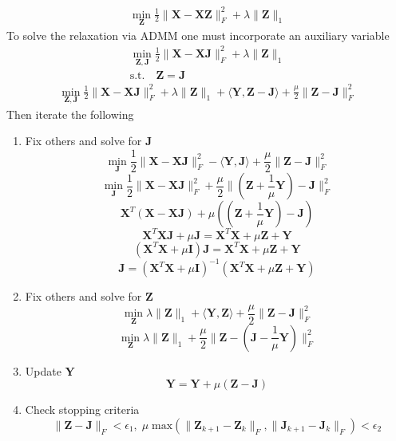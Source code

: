 \documentclass{article}
\begin{document}
\begin{align}
\min_{\mathbf Z} \frac12\|\mathbf X - \mathbf X\mathbf Z\|^2_F + \lambda\|\mathbf Z\|_{1}
\end{align}
To solve the relaxation via ADMM one must incorporate an auxiliary variable
\begin{align}
\min_{\mathbf{Z, J}} \frac12\|\mathbf X - \mathbf X\mathbf J\|^2_F + \lambda\|\mathbf Z\|_{1} \\
\text{s.t.} \quad \mathbf{Z = J} \nonumber
\end{align}
\begin{align}
\min_{\mathbf{Z, J}} \frac12\|\mathbf X - \mathbf X\mathbf J\|^2_F + \lambda\|\mathbf Z\|_{1} + \langle \mathbf{Y, Z - J} \rangle + \frac{\mu}{2} \| \mathbf{Z - J} \|_F^2
\end{align}
Then iterate the following
\begin{enumerate}
\item Fix others and solve for $\mathbf J$
\[
\min_{\mathbf J} \frac12\|\mathbf X - \mathbf X\mathbf J\|^2_F - \langle \mathbf{Y, J} \rangle + \frac{\mu}{2} \| \mathbf{Z - J} \|_F^2
\]
\[
\min_{\mathbf J} \frac12\|\mathbf X - \mathbf X\mathbf J\|^2_F + \frac{\mu}{2} \| (\mathbf Z + \frac{1}{\mu} \mathbf Y ) - \mathbf J \|_F^2
\]
\[
\mathbf X^T(\mathbf X - \mathbf X\mathbf J) + \mu ( (\mathbf Z + \frac{1}{\mu} \mathbf Y ) - \mathbf J )
\]
\[
\mathbf X^T\mathbf X\mathbf J  + \mu \mathbf J = \mathbf X^T\mathbf X + \mu \mathbf Z + \mathbf Y
\]
\[
(\mathbf X^T\mathbf X + \mu \mathbf I )\mathbf J = \mathbf X^T\mathbf X + \mu \mathbf Z + \mathbf Y
\]
\[
\mathbf J = (\mathbf X^T\mathbf X + \mu \mathbf I )^{-1} (\mathbf X^T\mathbf X + \mu \mathbf Z + \mathbf Y)
\]

\item Fix others and solve for $\mathbf Z$
\[
\min_{\mathbf Z} \lambda\|\mathbf Z\|_{1} + \langle \mathbf{Y, Z} \rangle + \frac{\mu}{2} \| \mathbf{Z - J} \|_F^2
\]
\[
\min_{\mathbf Z} \lambda\|\mathbf Z\|_{1} + \frac{\mu}{2} \| \mathbf Z - (\mathbf J - \frac{1}{\mu} \mathbf Y) \|_F^2
\]

\item Update $\mathbf Y$
\[
\mathbf Y = \mathbf Y + \mu (\mathbf{Z - J})
\]

\item Check stopping criteria
\[
\| \mathbf Z - \mathbf J \|_F  < \epsilon_1, \;
\mu \; \textrm{max} ( \| \mathbf Z_{k+1} - \mathbf Z_{k}  \|_F  , \|  \mathbf J_{k+1} - \mathbf J_{k} \|_F) < \epsilon_2
\]

\end{enumerate}
\end{document}
